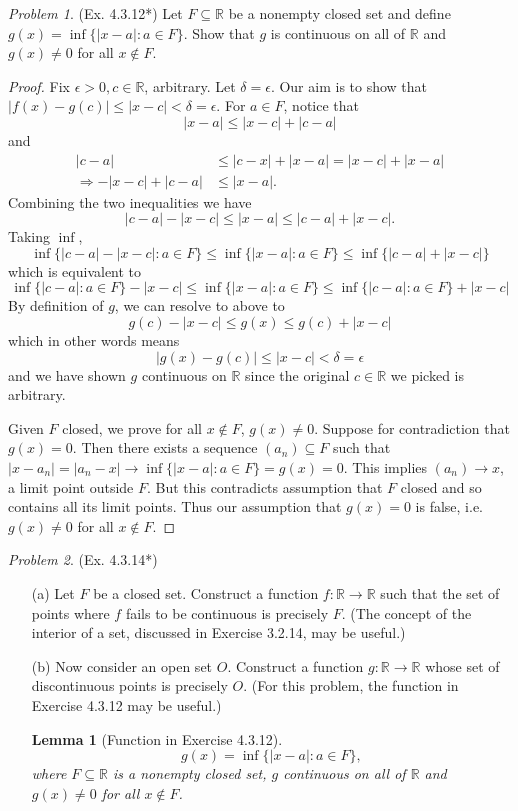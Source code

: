 \documentclass[11pt,twoside, reqno]{amsart}
\newtheorem{Lm}[Thm]{Lemma}
\theoremstyle{remark}
\newtheorem{Prob}{Problem}
\def\R{\mathbb R}
\renewcommand{\implies}{\Rightarrow}
\begin{document}
\begin{Prob}(Ex. 4.3.12*) Let $F \subseteq \R$ be a nonempty closed set and define $g(x) = \inf \{|x-a| : a \in F\}$. Show that $g$ is continuous on all of $\R$ and $g(x) \neq 0$ for all $x \not \in F$.
\end{Prob}

\begin{proof}
Fix $\epsilon > 0, c \in \R$, arbitrary. Let $\delta = \epsilon$. Our aim is to show that $|f(x) - g(c)| \leq |x - c| < \delta = \epsilon$. For $a \in F$, notice that
$$
    |x - a| \leq |x - c| + |c - a|
$$
and 
\begin{align*}
    |c - a| & \leq |c - x| + |x - a| = |x - c| + |x - a| \\
    \implies -|x - c| + |c - a| & \leq |x - a|.
\end{align*}
Combining the two inequalities we have
$$
    |c - a| - |x - c| \leq |x - a| \leq |c - a| + |x - c|.
$$
Taking $\inf$,
$$
    \inf\{|c - a| - |x - c| : a \in F\} \leq \inf \{|x - a| : a \in F \} \leq \inf \{|c - a| + |x - c| \}
$$
which is equivalent to
$$
    \inf \{|c - a| : a \in F\} - |x - c| \leq \inf \{ |x - a| : a \in F \} \leq \inf \{|c - a| : a \in F\}+ |x - c|
$$
By definition of $g$, we can resolve to above to
$$
    g(c) - |x - c| \leq g(x) \leq g(c) + |x - c|
$$
which in other words means
$$
    |g(x) - g(c)| \leq |x - c| < \delta = \epsilon
$$
and we have shown $g$ continuous on $\R$ since the original $c \in \R$ we picked is arbitrary.

Given $F$ closed, we prove for all $x \not \in F$, $g(x) \neq 0$. Suppose for contradiction that $g(x) = 0$. Then there exists a sequence $(a_n) \subseteq F$ such that $|x - a_n| = |a_n - x| \to \inf \{|x - a| : a \in F\} = g(x) = 0$. This implies $(a_n) \to x$, a limit point outside $F$. But this contradicts assumption that $F$ closed and so contains all its limit points. Thus our assumption that $g(x) = 0$ is false, i.e. $g(x) \neq 0$ for all $x \not \in F$.

\end{proof}

\begin{Prob}(Ex. 4.3.14*)
\begin{enumerate}
    \item [(a)] Let $F$ be a closed set. Construct a function $f : \R \to \R$ such that the set of points where $f$ fails to be continuous is precisely $F$. (The concept of the interior of a set, discussed in Exercise 3.2.14, may be useful.)
    \item [(b)] Now consider an open set $O$. Construct a function $g : \R \to \R$ whose set of discontinuous points is precisely $O$. (For this problem, the function in Exercise 4.3.12 may be useful.)
    \begin{Lm}[Function in Exercise 4.3.12]
    $$
        g(x) = \inf \{|x-a| : a \in F\},
    $$
    where $F \subseteq \R$ is a nonempty closed set, $g$ continuous on all of $\R$ and $g(x) \neq 0$ for all $x \not \in F$.
    \end{Lm}
\end{enumerate}
\end{Prob}
\end{document}
